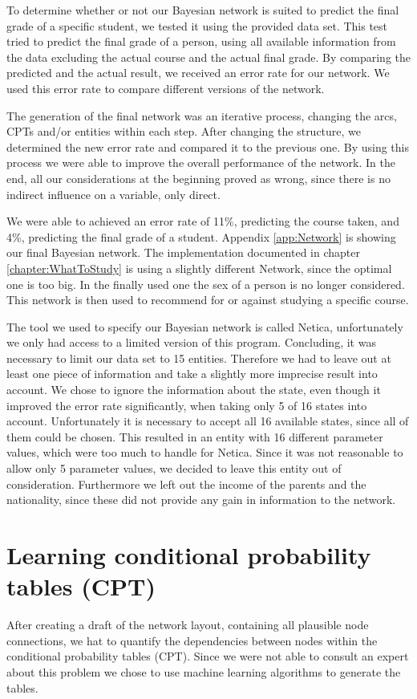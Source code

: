 \documentclass[%
	pdftex,
	oneside,        %
	11pt,           %
	parskip=half,   %
	headsepline,    %
	footsepline,    %
	abstracton,     %
	USenglish,      %
	a4paper,        %
]{report}
\begin{document}
To determine whether or not our Bayesian network is suited to predict the final grade of a specific student, we tested it using the provided data set. This test tried to predict the final grade of a person, using all available information from the data excluding the actual course and the actual final grade. By comparing the predicted and the actual result, we received an error rate for our network. We used this error rate to compare different versions of the network.

The generation of the final network was an iterative process, changing the arcs, CPTs and/or entities within each step. After changing the structure, we determined the new error rate and compared it to the previous one. By using this process we were able to improve the overall performance of the network. In the end, all our considerations at the beginning proved as wrong, since there is no indirect influence on a variable, only direct.

We were able to achieved an error rate of 11\%, predicting the course taken, and 4\%, predicting the final grade of a student. Appendix \vref{app:Network} is showing our final Bayesian network. The implementation documented in chapter \vref{chapter:WhatToStudy} is using a slightly different Network, since the optimal one is too big. In the finally used one the sex of a person is no longer considered. This network is then used to recommend for or against studying a specific course. 

The tool we used to specify our Bayesian network is called Netica, unfortunately we only had access to a limited version of this program. Concluding, it was necessary to limit our data set to 15 entities. Therefore we had to leave out at least one piece of information and take a slightly more imprecise result into account. We chose to ignore the information about the state, even though it improved the error rate significantly, when taking only 5 of 16 states into account. Unfortunately it is necessary to accept all 16 available states, since all of them could be chosen. This resulted in an entity with 16 different parameter values, which were too much to handle for Netica. Since it was not reasonable to allow only 5 parameter values, we decided to leave this entity out of consideration. Furthermore we left out the income of the parents and the nationality, since these did not provide any gain in information to the network.

\chapter{Learning conditional probability tables (CPT)}
After creating a draft of the network layout, containing all plausible node connections, we hat to quantify the dependencies between nodes within the conditional probability tables (CPT). Since we were not able to consult an expert about this problem we chose to use machine learning algorithms to generate the tables.
\end{document}
